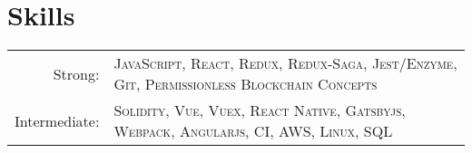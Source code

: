 \documentclass[a4paper,10pt]{article}
\begin{document}
\section{Skills}
\begin{tabular}{rl}
    Strong:& \textsc{JavaScript}, \textsc{React}, \textsc{Redux}, \textsc{Redux-Saga}, \textsc{Jest/Enzyme}, \textsc{Git}, \textsc{Permissionless Blockchain Concepts}\\
    Intermediate:& \textsc{Solidity}, \textsc{Vue}, \textsc{Vuex}, \textsc{React Native}, \textsc{Gatsbyjs}, \textsc{Webpack}, \textsc{Angularjs}, \textsc{CI}, \textsc{AWS}, \textsc{Linux}, \textsc{SQL}\\
\end{tabular}
\end{document}
